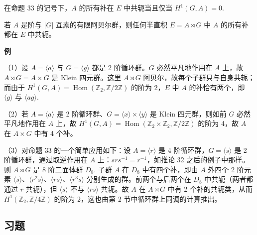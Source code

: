 \begin{corollary}\label{cor:17.34}
在命题 33 的记号下，\(A\) 的所有补在 \(E\) 中共轭当且仅当 \(H^1(G, A) = 0\).
\end{corollary}

\begin{corollary}\label{cor:17.35}
若 \(A\) 是阶与 \(|G|\) 互素的有限阿贝尔群，则任何半直积 \(E = A \rtimes G\) 中 \(A\) 的所有补都在 \(E\) 中共轭。
\end{corollary}

\noindent\textbf{例}

（1）设 \(A = \langle a\rangle\) 与 \(G = \langle g\rangle\) 都是 2 阶循环群。\(G\) 必然平凡地作用在 \(A\) 上，故 \(A \rtimes G = A \times G\) 是 Klein 四元群。这里 \(A \rtimes G\) 阿贝尔，故每个子群只与自身共轭；而由于 \(H^1(G, A) = \operatorname{Hom}(\mathbb{Z}_2, \mathbb{Z}/2\mathbb{Z})\) 的阶为 2，\(E\) 中 \(A\) 的补恰有两个，即 \(\langle g\rangle\) 与 \(\langle ag\rangle\).

（2）若 \(A = \langle a\rangle\) 是 2 阶循环群、\(G = \langle x\rangle \times \langle y\rangle\) 是 Klein 四元群，则如前 \(G\) 必然平凡地作用在 \(A\) 上，故 \(H^1(G, A) = \operatorname{Hom}(\mathbb{Z}_2 \times \mathbb{Z}_2, \mathbb{Z}/2\mathbb{Z})\) 的阶为 4，故 \(A\) 在 \(A \times G\) 中有 4 个补。

（3）对命题 33 的一个简单应用如下：设 \(A = \langle r\rangle\) 是 4 阶循环群，\(G = \langle s\rangle\) 是 2 阶循环群，通过取逆作用在 \(A\) 上：\(srs^{-1} = r^{-1}\)，如推论 32 之后的例子中那样。则 \(A \rtimes G\) 是 8 阶二面体群 \(D_8\). 子群 \(A\) 在 \(D_8\) 中有四个补，即由 \(A\) 外四个 2 阶元素 \(\langle s\rangle\)、\(\langle r^2s\rangle\)、\(\langle rs\rangle\)、\(\langle r^3s\rangle\) 分别生成的群。前两个与后两个在 \(D_8\) 中共轭（两者都通过 \(r\) 共轭），但 \(\langle s\rangle\) 不与 \(\langle rs\rangle\) 共轭。故 \(A\) 在 \(A \rtimes G\) 中有 2 个补的共轭类，从而 \(H^1(\mathbb{Z}_2, \mathbb{Z}/4\mathbb{Z})\) 的阶为 2，这也由第 2 节中循环群上同调的计算推出。

\subsection*{习题}

